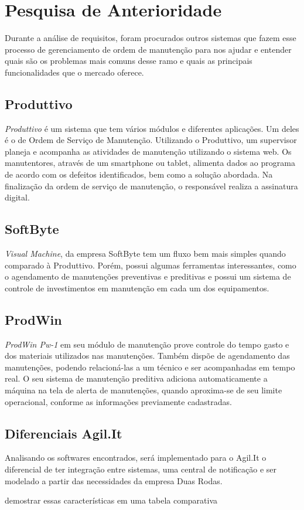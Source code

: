 \chapter{Pesquisa de Anterioridade}
Durante a análise de requisitos, foram procurados outros sistemas que fazem esse processo de gerenciamento de ordem de manutenção para nos ajudar e entender quais são os problemas mais comuns desse ramo e quais as principais funcionalidades que o mercado oferece.

\section{Produttivo}

\textit{Produttivo} é um sistema que tem vários módulos e diferentes aplicações. Um deles é o de Ordem de Serviço de Manutenção.
Utilizando o Produttivo, um supervisor planeja e acompanha as atividades de manutenção utilizando o sistema web. Os manutentores, através de um smartphone ou tablet, alimenta dados ao programa de acordo com os defeitos identificados, bem como a solução abordada. Na finalização da ordem de serviço de manutenção, o responsável realiza a assinatura digital. \cite{produttivo}


\section{SoftByte}
\textit{Visual Machine}, da empresa SoftByte tem um fluxo bem mais simples quando comparado à Produttivo. Porém, possui algumas ferramentas interessantes, como o agendamento de manutenções preventivas e preditivas e possui um sistema de controle de investimentos em manutenção em cada um dos equipamentos. \cite{softbyte}


\section{ProdWin}
\textit{ProdWin Pw-1} em seu módulo de manutenção prove controle do tempo gasto e dos materiais utilizados nas manutenções. Também dispõe de agendamento das manutenções, podendo relacioná-las a um técnico e ser acompanhadas em tempo real. O seu sistema de manutenção preditiva adiciona automaticamente a máquina na tela de alerta de manutenções, quando aproxima-se de seu limite operacional, conforme as informações previamente cadastradas. \cite{prodwin}

\section{Diferenciais Agil.It}
Analisando os softwares encontrados, será implementado para o Agil.It o diferencial de ter integração entre sistemas, uma central de notificação e ser modelado a partir das necessidades da empresa Duas Rodas.

{\color{red}demostrar essas características em uma tabela comparativa}